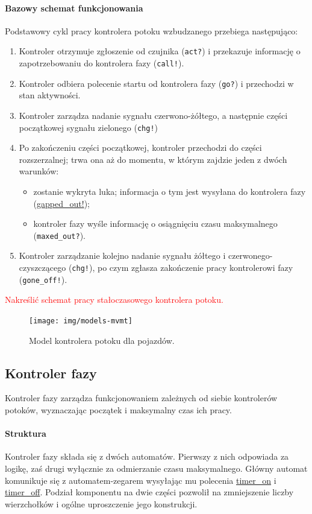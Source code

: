 \documentclass{pracamgr}
\newcommand{\todo}[1]{\textcolor{red}{#1}}
\theoremstyle{plain}
\begin{document}
\paragraph{Bazowy schemat funkcjonowania} Podstawowy cykl pracy
kontrolera potoku wzbudzanego przebiega następująco:
\begin{enumerate}
  \item Kontroler otrzymuje zgłoszenie od czujnika (\texttt{act?}) i przekazuje
  informację o zapotrzebowaniu do kontrolera fazy (\texttt{call!}).
  \item Kontroler odbiera polecenie startu od kontrolera fazy
  (\texttt{go?}) i przechodzi w stan aktywności.
  \item Kontroler zarządza nadanie sygnału czerwono-żółtego, a
  następnie części początkowej sygnału zielonego (\texttt{chg!})
  \item Po zakończeniu części początkowej, kontroler przechodzi do
  części rozszerzalnej; trwa ona aż do momentu, w którym zajdzie jeden
  z dwóch warunków:
  \begin{itemize}
    \item zostanie wykryta luka; informacja o tym jest wysyłana do
    kontrolera fazy (\url{gapped_out!});
    \item kontroler fazy wyśle informację o osiągnięciu czasu
    maksymalnego (\texttt{maxed\_out?}).
  \end{itemize}
  \item Kontroler zarządzanie kolejno nadanie sygnału żółtego i
  czerwonego-czyszczącego (\texttt{chg!}), po czym zgłasza zakończenie pracy
  kontrolerowi fazy (\texttt{gone\_off!}).
\end{enumerate}

\todo{Nakreślić schemat pracy stałoczasowego kontrolera potoku.}

\begin{figure}
  \centering
  \texttt{[image: img/models-mvmt]}
  \caption{Model kontrolera potoku dla pojazdów.}
  \label{img:mvmt-ctrl}
\end{figure}

\subsection{Kontroler fazy}
Kontroler fazy zarządza funkcjonowaniem zależnych od siebie
kontrolerów potoków, wyznaczając początek i maksymalny czas ich pracy.

\paragraph{Struktura} Kontroler fazy składa się z dwóch
automatów. Pierwszy z nich odpowiada za logikę, zaś drugi wyłącznie za
odmierzanie czasu maksymalnego. Główny automat komunikuje się z
automatem-zegarem wysyłając mu polecenia \url{timer_on} i
\url{timer_off}. Podział komponentu na dwie części pozwolił na
zmniejszenie liczby wierzchołków i ogólne uproszczenie jego konstrukcji.
\end{document}
